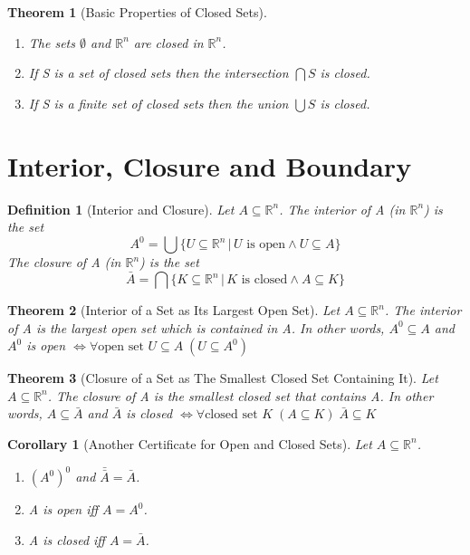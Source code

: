 \documentclass[11pt, oneside]{book}
\theoremstyle{break}
\newtheorem{thm}{Theorem}[section]
\newtheorem{crly}{Corollary}[thm]
\newtheorem{defn}{Definition}[section]
\newcommand{\bb}[1]{\mathbb{#1}}			%
\begin{document}
\begin{thm}[Basic Properties of Closed Sets]
	\begin{enumerate}
		\item The sets $\emptyset$ and $\bb{R}^n$ are closed in $\bb{R}^n$.
		\item If S is a set of closed sets then the intersection $\bigcap S$ is closed.
		\item If S is a finite set of closed sets then the union $\bigcup S$ is closed.
	\end{enumerate}
\end{thm}


\section{Interior, Closure and Boundary}

\begin{defn}[Interior and Closure]
	Let $A \subseteq \bb{R}^n$. The interior of A (in $\bb{R}^n$) is the set
	\begin{equation*}
		A^0 = \bigcup \{ U \subseteq \bb{R}^n \, | \, U \text{ is open} \land U \subseteq A\}
	\end{equation*}
	The closure of A (in $\bb{R}^n$) is the set
	\begin{equation*}
		\bar{A} = \bigcap \{ K \subseteq \bb{R}^n \, | \, K \text{ is closed} \land A \subseteq K\}
	\end{equation*}
\end{defn}

\begin{thm}[Interior of a Set as Its Largest Open Set]
	Let $A \subseteq \bb{R}^n$. The interior of A is the largest open set which is contained in A. In other words, $A^0 \subseteq A$ and $A^0$ is open $\iff \forall \text{open set } U \subseteq A \; (U \subseteq A^0)$
\end{thm}

\begin{thm}[Closure of a Set as The Smallest Closed Set Containing It]
	Let $A \subseteq \bb{R}^n$. The closure of A is the smallest closed set that contains A. In other words, $A \subseteq \bar{A}$ and $\bar{A}$ is closed $\iff \forall \text{closed set } K \; (A \subseteq K) \; \bar{A} \subseteq K$
\end{thm}

\begin{crly}[Another Certificate for Open and Closed Sets]
	Let $A \subseteq \bb{R}^n$.
	\begin{enumerate}
		\item $(A^0)^0$ and $\bar{\bar{A}} = \bar{A}$.
		\item A is open iff $A = A^0$.
		\item A is closed iff $A = \bar{A}$.
	\end{enumerate}
\end{crly}
\end{document}
